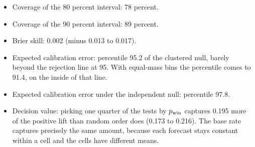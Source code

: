 \begin{itemize}
\item Coverage of the 80 percent interval: 78 percent.
\item Coverage of the 90 percent interval: 89 percent.
\item Brier skill: 0.002 (minus 0.013 to 0.017).
\item Expected calibration error: percentile 95.2 of the clustered null, barely beyond the rejection line at 95. With equal-mass bins the percentile comes to 91.4, on the inside of that line.
\item Expected calibration error under the independent null: percentile 97.8.
\item Decision value: picking one quarter of the tests by $p_{\mathrm{win}}$ captures 0.195 more of the positive lift than random order does (0.173 to 0.216). The base rate captures precisely the same amount, because each forecast stays constant within a cell and the cells have different means.
\end{itemize}
